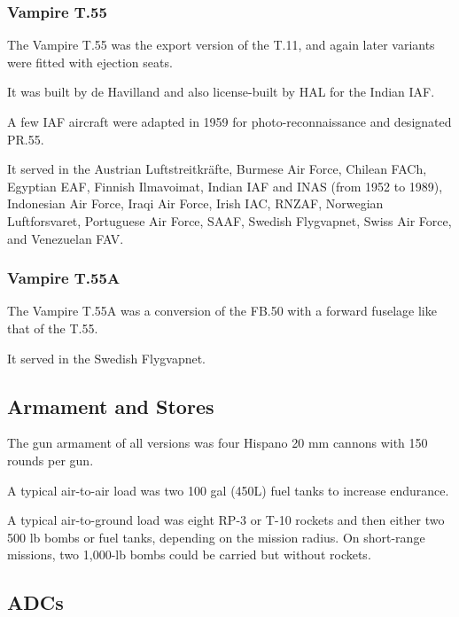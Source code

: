 \subsubsection{Vampire T.55}

The Vampire T.55 was the export version of the T.11, and again later variants were fitted with ejection seats.

It was built by de Havilland and also license-built by HAL for the Indian IAF.

A few IAF aircraft were adapted in 1959 for photo-reconnaissance and designated PR.55.

It served in the Austrian Luftstreitkräfte, Burmese Air Force, Chilean FACh, Egyptian EAF, Finnish Ilmavoimat, Indian IAF and INAS (from 1952 to 1989), Indonesian Air Force, Iraqi Air Force, Irish IAC, RNZAF, Norwegian Luftforsvaret, Portuguese Air Force, SAAF, Swedish Flygvapnet, Swiss Air Force, and Venezuelan FAV.

\subsubsection{Vampire T.55A}

The Vampire T.55A was a conversion of the FB.50 with a forward fuselage like that of the T.55.

It served in the Swedish Flygvapnet.

\subsection{Armament and Stores}

The gun armament of all versions was four Hispano 20 mm cannons with 150 rounds per gun.

A typical air-to-air load was two 100 gal (450L) fuel tanks to increase endurance.

A typical air-to-ground load was eight RP-3 or T-10 rockets and then either two 500 lb bombs or fuel tanks, depending on the mission radius. On short-range missions, two 1,000-lb bombs could be carried but without rockets.

\subsection{ADCs}

\begin{adclist}
\end{adclist}

